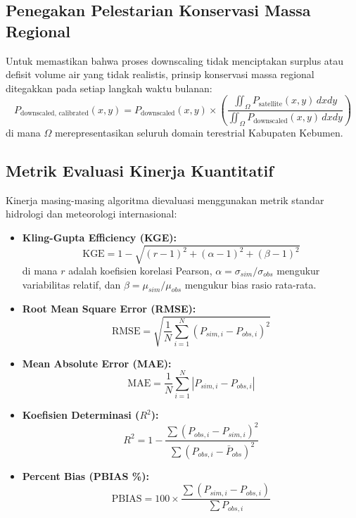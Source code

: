 \documentclass[11pt,a4paper,titlepage]{article}
\begin{document}
\subsection{Penegakan Pelestarian Konservasi Massa Regional}
Untuk memastikan bahwa proses downscaling tidak menciptakan surplus atau defisit volume air yang tidak realistis, prinsip konservasi massa regional ditegakkan pada setiap langkah waktu bulanan:
\begin{equation}
    P_{\text{downscaled, calibrated}}(x, y) = P_{\text{downscaled}}(x, y) \times \left( \frac{\iint_{\Omega} P_{\text{satellite}}(x, y) \, dx dy}{\iint_{\Omega} P_{\text{downscaled}}(x, y) \, dx dy} \right)
    \label{eq:mass_conservation}
\end{equation}
di mana $\Omega$ merepresentasikan seluruh domain terestrial Kabupaten Kebumen.

\subsection{Metrik Evaluasi Kinerja Kuantitatif}
Kinerja masing-masing algoritma dievaluasi menggunakan metrik standar hidrologi dan meteorologi internasional:
\begin{itemize}
    \item \textbf{Kling-Gupta Efficiency (KGE):}
    \begin{equation}
        \text{KGE} = 1 - \sqrt{(r - 1)^2 + (\alpha - 1)^2 + (\beta - 1)^2}
    \end{equation}
    di mana $r$ adalah koefisien korelasi Pearson, $\alpha = \sigma_{sim} / \sigma_{obs}$ mengukur variabilitas relatif, dan $\beta = \mu_{sim} / \mu_{obs}$ mengukur bias rasio rata-rata.
    \item \textbf{Root Mean Square Error (RMSE):}
    \begin{equation}
        \text{RMSE} = \sqrt{\frac{1}{N} \sum_{i=1}^{N} (P_{sim, i} - P_{obs, i})^2}
    \end{equation}
    \item \textbf{Mean Absolute Error (MAE):}
    \begin{equation}
        \text{MAE} = \frac{1}{N} \sum_{i=1}^{N} |P_{sim, i} - P_{obs, i}|
    \end{equation}
    \item \textbf{Koefisien Determinasi ($R^2$):}
    \begin{equation}
        R^2 = 1 - \frac{\sum (P_{obs, i} - P_{sim, i})^2}{\sum (P_{obs, i} - \bar{P}_{obs})^2}
    \end{equation}
    \item \textbf{Percent Bias (PBIAS \%):}
    \begin{equation}
        \text{PBIAS} = 100 \times \frac{\sum (P_{sim, i} - P_{obs, i})}{\sum P_{obs, i}}
    \end{equation}
\end{itemize}
\end{document}
